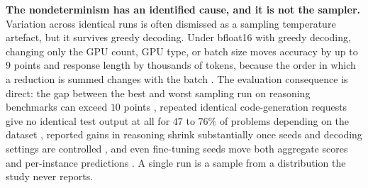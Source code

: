 \documentclass[11pt]{article}
\begin{document}
\textbf{The nondeterminism has an identified cause, and it is not the sampler.}
Variation across identical runs is often dismissed as a sampling temperature
artefact, but it survives greedy decoding. Under bfloat16 with greedy decoding,
changing only the GPU count, GPU type, or batch size moves accuracy by up to
$9$ points and response length by thousands of tokens, because the order in
which a reduction is summed changes with the batch
\cite{yuan2025numerical,fu2026tokenprob}. The evaluation consequence is direct:
the gap between the best and worst sampling run on reasoning benchmarks can
exceed $10$ points \cite{song2024greedy}, repeated identical code-generation
requests give no identical test output at all for $47$ to $76\%$ of problems
depending on the dataset \cite{ouyang2025chatgptnondet}, reported gains in
reasoning shrink substantially once seeds and decoding settings are controlled
\cite{hochlehnert2025sober}, and even fine-tuning seeds move both aggregate
scores and per-instance predictions \cite{bui2025seeds}. A single run is a
sample from a distribution the study never reports.
\end{document}
